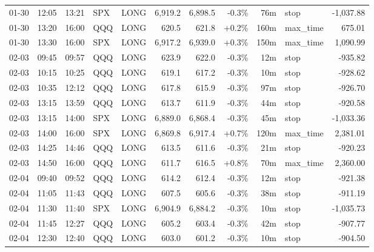 \documentclass[11pt,a4paper,twoside]{article}
\begin{document}
\begin{center}
\begin{longtable}{>{\color{txtmain}}l l l l l r r r r >{\color{txtmain}}l r}
01-30 & 12:05 & 13:21 & SPX & LONG & 6,919.2 & 6,898.5 & \textcolor{lossred}{-0.3\%} & 76m & stop & \textcolor{lossred}{-1,037.88} \\
01-30 & 13:20 & 16:00 & QQQ & LONG & 620.5 & 621.8 & \textcolor{wingreen}{+0.2\%} & 160m & max\_time & \textcolor{wingreen}{675.01} \\
01-30 & 13:30 & 16:00 & SPX & LONG & 6,917.2 & 6,939.0 & \textcolor{wingreen}{+0.3\%} & 150m & max\_time & \textcolor{wingreen}{1,090.99} \\
02-03 & 09:45 & 09:57 & QQQ & LONG & 623.9 & 622.0 & \textcolor{lossred}{-0.3\%} & 12m & stop & \textcolor{lossred}{-935.82} \\
02-03 & 10:15 & 10:25 & QQQ & LONG & 619.1 & 617.2 & \textcolor{lossred}{-0.3\%} & 10m & stop & \textcolor{lossred}{-928.62} \\
02-03 & 10:35 & 12:12 & QQQ & LONG & 617.8 & 615.9 & \textcolor{lossred}{-0.3\%} & 97m & stop & \textcolor{lossred}{-926.70} \\
02-03 & 13:15 & 13:59 & QQQ & LONG & 613.7 & 611.9 & \textcolor{lossred}{-0.3\%} & 44m & stop & \textcolor{lossred}{-920.58} \\
02-03 & 13:15 & 14:00 & SPX & LONG & 6,889.0 & 6,868.4 & \textcolor{lossred}{-0.3\%} & 45m & stop & \textcolor{lossred}{-1,033.36} \\
02-03 & 14:00 & 16:00 & SPX & LONG & 6,869.8 & 6,917.4 & \textcolor{wingreen}{+0.7\%} & 120m & max\_time & \textcolor{wingreen}{2,381.01} \\
02-03 & 14:25 & 14:46 & QQQ & LONG & 613.5 & 611.6 & \textcolor{lossred}{-0.3\%} & 21m & stop & \textcolor{lossred}{-920.23} \\
02-03 & 14:50 & 16:00 & QQQ & LONG & 611.7 & 616.5 & \textcolor{wingreen}{+0.8\%} & 70m & max\_time & \textcolor{wingreen}{2,360.00} \\
02-04 & 09:40 & 09:52 & QQQ & LONG & 614.2 & 612.4 & \textcolor{lossred}{-0.3\%} & 12m & stop & \textcolor{lossred}{-921.38} \\
02-04 & 11:05 & 11:43 & QQQ & LONG & 607.5 & 605.6 & \textcolor{lossred}{-0.3\%} & 38m & stop & \textcolor{lossred}{-911.19} \\
02-04 & 11:30 & 11:40 & SPX & LONG & 6,904.9 & 6,884.2 & \textcolor{lossred}{-0.3\%} & 10m & stop & \textcolor{lossred}{-1,035.73} \\
02-04 & 11:45 & 12:27 & QQQ & LONG & 605.2 & 603.4 & \textcolor{lossred}{-0.3\%} & 42m & stop & \textcolor{lossred}{-907.77} \\
02-04 & 12:30 & 12:40 & QQQ & LONG & 603.0 & 601.2 & \textcolor{lossred}{-0.3\%} & 10m & stop & \textcolor{lossred}{-904.50} \\

\end{longtable}
\end{center}
\end{document}
